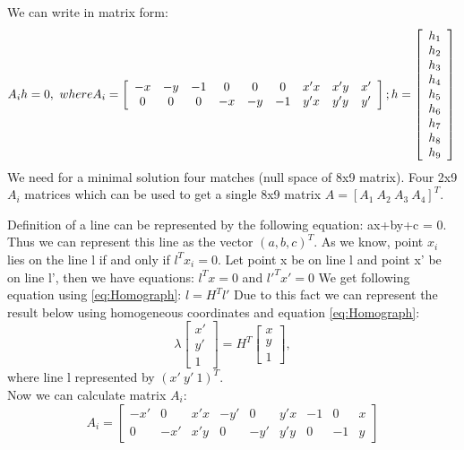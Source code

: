 \documentclass[a4paper, twoside, english]{article}
\begin{document}
We can write  in matrix form:
 \begin{equation*}
 	A_ih=0,\ where \\
	A_i= 
	\left[
	\begin{array}{ccccccccc}
		-x & -y & -1 & 0 & 0 & 0 & x'x &x'y & x'\\
		0 & 0 & 0 & -x & -y & -1 & y'x & y'y & y'
		
	\end{array}
	\right]; \\ 
	h=\left[
	\begin{array}{c}
		h_1\\
		h_2\\
		h_3\\
		h_4\\
		h_5\\
		h_6\\
		h_7\\
		h_8\\
		h_9 		
	\end{array}
	\right]\\ 
\end{equation*}
We need for a minimal solution four matches (null space of 8x9 matrix). Four 2x9 $A_i$ matrices which can be used to get a single 8x9 matrix $A = [A_1\ A_2\ A_3\ A_4]^T$.

Definition of a line  can be represented by the following equation: ax+by+c = 0. Thus we can represent this line as the vector $(a,b,c)^T$. 
As we know, point $x_i$ lies on the line l if and only if $l^Tx_i = 0$. 
Let point x be on line l and point x' be on line l', then we have equations: $l^Tx = 0$ and $l'^Tx' = 0$
We get following equation using \ref{eq:Homograph}:
$l=H^Tl'$
Due to this fact we can represent the result below using homogeneous coordinates and equation \ref{eq:Homograph}:
\begin{equation*}
		\lambda \left[
	\begin{array}{ccc}
		x'\\
		y'\\
		1
	\end{array}
	\right] = 
	H^T
	\left[
	\begin{array}{ccc}
		x\\
		y\\
		1
	\end{array}
	\right],
\end{equation*}
where line l represented by $(x' \ y' \ 1)^T$. \\
Now we can calculate matrix $A_i$:
\begin{equation*}
	A_i= 
	\left[
	\begin{array}{ccccccccc}
		-x' & 0 & x'x & -y' & 0 & y'x & -1 & 0 & x\\
		0 & -x' & x'y & 0 & -y' & y'y & 0 & -1 & y
		
	\end{array}
	\right]	
\end{equation*}
\end{document}
